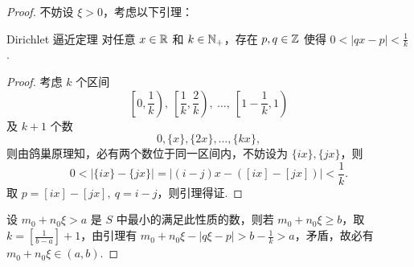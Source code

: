 \begin{proof}
    不妨设 $\xi > 0$，考虑以下引理：
    \begin{center}
        \begin{minipage}{0.85\textwidth}
            \begin{lemma}{Dirichlet 逼近定理}{}
                对任意 $x \in \mathbb R$ 和 $k \in \mathbb N_+$，存在 $p, q \in \mathbb Z$ 使得 $0 < |qx - p| < \frac 1 k$.
                \tcblower
                \begin{proof}
                    考虑 $k$ 个区间
                    \[
                        \left[ 0, \frac 1 k \right),\ \left[ \frac 1 k, \frac 2 k \right),\ \ldots,\ \left[ 1 - \frac 1 k, 1 \right)
                    \]
                    及 $k + 1$ 个数
                    \[
                        0, \{ x \}, \{ 2x \}, \ldots, \{ kx \},
                    \]
                    则由鸽巢原理知，必有两个数位于同一区间内，不妨设为 $\{ ix \}, \{ jx \}$，则
                    \[
                        0 < |\{ ix \} - \{ jx \}| = |(i-j)x - ([ix] - [jx])| < \frac 1 k.
                    \]
                    取 $p = [ix] - [jx],\ q = i-j$，则引理得证.
                \end{proof}
            \end{lemma}
        \end{minipage}
    \end{center}
    设 $m_0 + n_0 \xi > a$ 是 $S$ 中最小的满足此性质的数，则若 $m_0 + n_0 \xi \geqslant b$，取 $k = \left[ \frac 1 {b - a} \right] + 1$，由引理有 $m_0 + n_0 \xi - |q\xi - p| > b - \frac 1 k > a$，矛盾，故必有 $m_0 + n_0 \xi \in (a, b)$.
\end{proof}